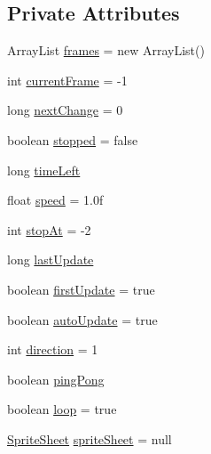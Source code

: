 \subsection*{Private Attributes}
\begin{DoxyCompactItemize}
\item 
Array\+List \mbox{\hyperlink{classorg_1_1newdawn_1_1slick_1_1_animation_a39f0c6a16e479985b22f7dd3bb781bf7}{frames}} = new Array\+List()
\item 
int \mbox{\hyperlink{classorg_1_1newdawn_1_1slick_1_1_animation_a358e1f2b9d9a05f83a416405e6bcd332}{current\+Frame}} = -\/1
\item 
long \mbox{\hyperlink{classorg_1_1newdawn_1_1slick_1_1_animation_a28280195bf1df3c929ca69b1c4d59443}{next\+Change}} = 0
\item 
boolean \mbox{\hyperlink{classorg_1_1newdawn_1_1slick_1_1_animation_ab5b77fdd8772bd15d24ea9d21fa3873d}{stopped}} = false
\item 
long \mbox{\hyperlink{classorg_1_1newdawn_1_1slick_1_1_animation_a182e85f72de3430a216564720d0139bc}{time\+Left}}
\item 
float \mbox{\hyperlink{classorg_1_1newdawn_1_1slick_1_1_animation_a0ccda8ed8082763a52d2819e414dd5b9}{speed}} = 1.\+0f
\item 
int \mbox{\hyperlink{classorg_1_1newdawn_1_1slick_1_1_animation_a4b2bd97ccab1897bcca89f4d873b5db1}{stop\+At}} = -\/2
\item 
long \mbox{\hyperlink{classorg_1_1newdawn_1_1slick_1_1_animation_a5f6bf06ad6ea524d644858261b221794}{last\+Update}}
\item 
boolean \mbox{\hyperlink{classorg_1_1newdawn_1_1slick_1_1_animation_a1ddf04d31c943c41b82efbd1f2179d77}{first\+Update}} = true
\item 
boolean \mbox{\hyperlink{classorg_1_1newdawn_1_1slick_1_1_animation_a343dbff14a050cf8753e9a67746deede}{auto\+Update}} = true
\item 
int \mbox{\hyperlink{classorg_1_1newdawn_1_1slick_1_1_animation_a74926a0e9dbe938182b413a35f67c17f}{direction}} = 1
\item 
boolean \mbox{\hyperlink{classorg_1_1newdawn_1_1slick_1_1_animation_a6000f29f3e58e0470e2178e69345c027}{ping\+Pong}}
\item 
boolean \mbox{\hyperlink{classorg_1_1newdawn_1_1slick_1_1_animation_a44dd0ed98069bf4295965b8449362054}{loop}} = true
\item 
\mbox{\hyperlink{classorg_1_1newdawn_1_1slick_1_1_sprite_sheet}{Sprite\+Sheet}} \mbox{\hyperlink{classorg_1_1newdawn_1_1slick_1_1_animation_ad353dea56461398b73362f581b7efb7d}{sprite\+Sheet}} = null
\end{DoxyCompactItemize}



